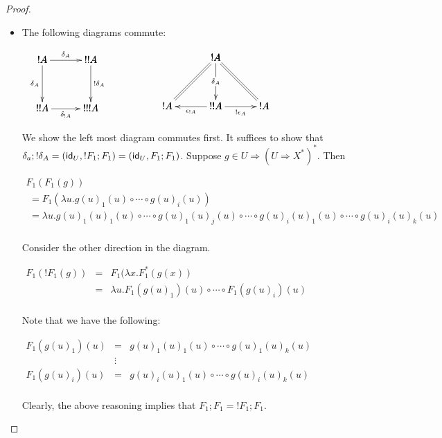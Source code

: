 \begin{proof}
\begin{center}
\begin{itemize}
    \item The following diagrams commute:
      \begin{center}
        \begin{math}
          \begin{array}{lll}
            \bfig
            \square[!A`!!A`!!A`!!!A;\delta_A`\delta_A`!\delta_A`\delta_{!A}]
            \efig
            &
              \,\,\,\,\,\,\,\,\,\,\,\,\,\,\,\,\,\,\,\,
            &
              \bfig
              \Atrianglepair/=`->`=`<-`->/[!A`!A`!!A`!A;`\delta_A``\epsilon_{!A}`!\epsilon_A]
           \efig
          \end{array}
        \end{math}
      \end{center}
      We show the left most diagram commutes first.  It suffices to
      show that
      $\delta_a;!\delta_A = (\mathsf{id}_U,!F_1;F_1) = (\mathsf{id}_U,F_1;F_1)$.  
      Suppose $g \in U \Rightarrow (U \Rightarrow X^*)^*$.  Then 
      \vspace{-15px}
      \begin{center}
        \small
        \begin{math}
          \begin{array}{lll}
            F_1(F_1(g)) \\
            \,\,= F_1(\lambda u.g(u)_1(u) \circ \cdots \circ g(u)_i(u))\\
            \,\,= \lambda u.g(u)_1(u)_1(u) \circ \cdots \circ g(u)_1(u)_j(u) \circ \cdots \circ g(u)_i(u)_1(u) \circ \cdots \circ g(u)_i(u)_k(u)\\
          \end{array}
        \end{math}
      \end{center}
      Consider the other direction in the diagram.  
      \begin{center}
        \begin{math}
          \begin{array}{lll}
            F_1(!F_1(g)) 
            & = & F_1(\lambda x.F^*_1(g(x))\\
            & = & \lambda u.F_1(g(u)_1)(u) \circ \cdots \circ F_1(g(u)_i)(u)\\            
          \end{array}
        \end{math}
      \end{center}
      Note that we have the following:
      \begin{center}
        \begin{math}
          \begin{array}{lll}
            F_1(g(u)_1)(u) & = & g(u)_1(u)_1(u) \circ \cdots \circ g(u)_1(u)_k(u)\\
            & \vdots & \\
            F_1(g(u)_i)(u) & = & g(u)_i(u)_1(u) \circ \cdots \circ g(u)_i(u)_k(u)\\
          \end{array}
        \end{math}
      \end{center}
      Clearly, the above reasoning implies that $F_1;F_1 = !F_1;F_1$.


\end{itemize}
\end{center}
\end{proof}
